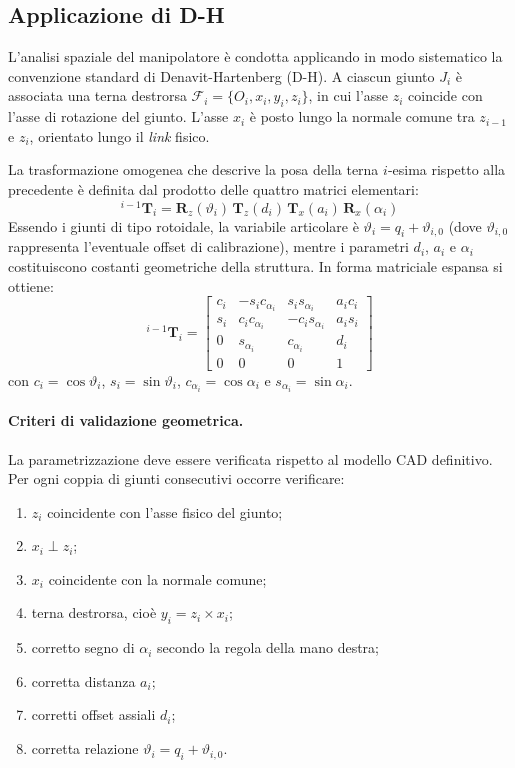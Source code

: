 \subsection{Applicazione di D-H}

L'analisi spaziale del manipolatore è condotta applicando in modo sistematico la convenzione standard di Denavit-Hartenberg (D-H). 
A ciascun giunto $J_i$ è associata una terna destrorsa $\mathcal F_i=\{O_i,x_i,y_i,z_i\}$, in cui l'asse $z_i$ coincide con l'asse di rotazione del giunto. 
L'asse $x_i$ è posto lungo la normale comune tra $z_{i-1}$ e $z_i$, orientato lungo il \textit{link} fisico.

La trasformazione omogenea che descrive la posa della terna $i$-esima rispetto alla precedente è definita dal prodotto delle quattro matrici elementari:
\[
    {}^{i-1}\boldsymbol{T}_i = \boldsymbol{R}_z(\vartheta_i)\,\boldsymbol{T}_z(d_i)\,\boldsymbol{T}_x(a_i)\,\boldsymbol{R}_x(\alpha_i)
\]
Essendo i giunti di tipo rotoidale, la variabile articolare è $\vartheta_i = q_i + \vartheta_{i,0}$ (dove $\vartheta_{i,0}$ rappresenta l'eventuale offset di calibrazione), mentre i parametri $d_i$, $a_i$ e $\alpha_i$ costituiscono costanti geometriche della struttura. 
In forma matriciale espansa si ottiene:
\begin{equation}
    {}^{i-1}\boldsymbol{T}_i=
    \begin{bmatrix}
        c_i & -s_i c_{\alpha_i} & s_i s_{\alpha_i} & a_i c_i\\
        s_i & c_i c_{\alpha_i} & -c_i s_{\alpha_i} & a_i s_i\\
        0 & s_{\alpha_i} & c_{\alpha_i} & d_i\\
        0 & 0 & 0 & 1
    \end{bmatrix}
\end{equation}
con $c_i=\cos\vartheta_i$, $s_i=\sin\vartheta_i$, $c_{\alpha_i}=\cos\alpha_i$ e $s_{\alpha_i}=\sin\alpha_i$.

\paragraph{Criteri di validazione geometrica.}
La parametrizzazione deve essere verificata rispetto al modello CAD definitivo.
Per ogni coppia di giunti consecutivi occorre verificare:
\begin{enumerate}
    \item $z_i$ coincidente con l'asse fisico del giunto;
    \item $x_i\perp z_i$;
    \item $x_i$ coincidente con la normale comune;
    \item terna destrorsa, cioè $y_i=z_i\times x_i$;
    \item corretto segno di $\alpha_i$ secondo la regola della mano destra;
    \item corretta distanza $a_i$;
    \item corretti offset assiali $d_i$;
    \item corretta relazione $\vartheta_i=q_i+\vartheta_{i,0}$.
\end{enumerate}

